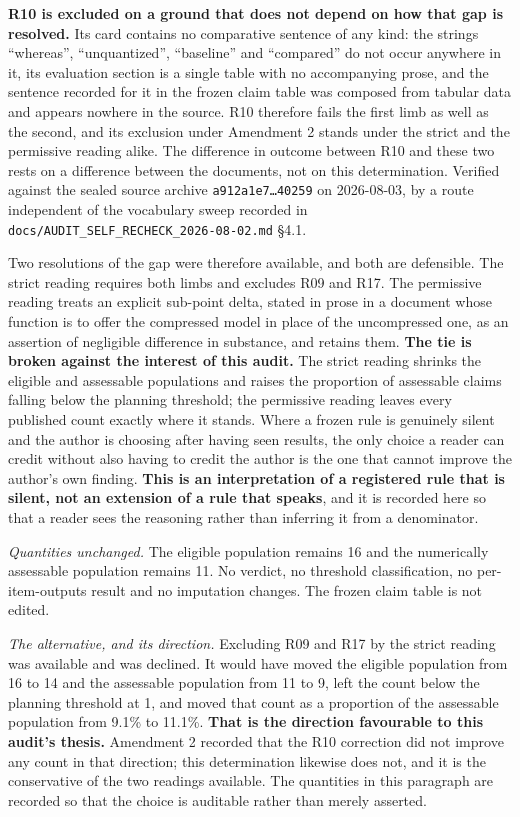 \textbf{R10 is excluded on a ground that does not depend on how that gap is resolved.} Its card contains no comparative sentence of any kind: the strings ``whereas'', ``unquantized'', ``baseline'' and ``compared'' do not occur anywhere in it, its evaluation section is a single table with no accompanying prose, and the sentence recorded for it in the frozen claim table was composed from tabular data and appears nowhere in the source. R10 therefore fails the first limb as well as the second, and its exclusion under Amendment 2 stands under the strict and the permissive reading alike. The difference in outcome between R10 and these two rests on a difference between the documents, not on this determination. Verified against the sealed source archive \texttt{a912a1e7\dots{}40259} on 2026-08-03, by a route independent of the vocabulary sweep recorded in \texttt{docs/\allowbreak{}AUDIT\_SELF\_RECHECK\_2026-\allowbreak{}08-\allowbreak{}02.md} \S{}4.1.

Two resolutions of the gap were therefore available, and both are defensible. The strict reading requires both limbs and excludes R09 and R17. The permissive reading treats an explicit sub-point delta, stated in prose in a document whose function is to offer the compressed model in place of the uncompressed one, as an assertion of negligible difference in substance, and retains them. \textbf{The tie is broken against the interest of this audit.} The strict reading shrinks the eligible and assessable populations and raises the proportion of assessable claims falling below the planning threshold; the permissive reading leaves every published count exactly where it stands. Where a frozen rule is genuinely silent and the author is choosing after having seen results, the only choice a reader can credit without also having to credit the author is the one that cannot improve the author's own finding. \textbf{This is an interpretation of a registered rule that is silent, not an extension of a rule that speaks}, and it is recorded here so that a reader sees the reasoning rather than inferring it from a denominator.

\emph{Quantities unchanged.} The eligible population remains 16 and the numerically assessable population remains 11. No verdict, no threshold classification, no per-item-outputs result and no imputation changes. The frozen claim table is not edited.

\emph{The alternative, and its direction.} Excluding R09 and R17 by the strict reading was available and was declined. It would have moved the eligible population from 16 to 14 and the assessable population from 11 to 9, left the count below the planning threshold at 1, and moved that count as a proportion of the assessable population from 9.1\% to 11.1\%. \textbf{That is the direction favourable to this audit's thesis.} Amendment 2 recorded that the R10 correction did not improve any count in that direction; this determination likewise does not, and it is the conservative of the two readings available. The quantities in this paragraph are recorded so that the choice is auditable rather than merely asserted.

